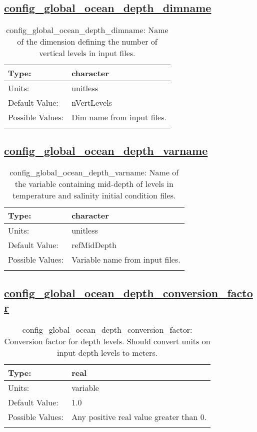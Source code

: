 \subsection[config\_global\_ocean\_depth\_dimname]{\hyperref[sec:nm_tab_global_ocean]{config\_global\_ocean\_depth\_dimname}}
\label{subsec:nm_sec_config_global_ocean_depth_dimname}
\begin{center}
\begin{longtable}{| p{2.0in} || p{4.0in} |}
    \hline
    Type: & character \\
    \hline
    Units: & \si{unitless} \\
    \hline
    Default Value: & nVertLevels \\
    \hline
    Possible Values: & Dim name from input files. \\
    \hline
    \caption{config\_global\_ocean\_depth\_dimname: Name of the dimension defining the number of vertical levels in input files.}
\end{longtable}
\end{center}
\subsection[config\_global\_ocean\_depth\_varname]{\hyperref[sec:nm_tab_global_ocean]{config\_global\_ocean\_depth\_varname}}
\label{subsec:nm_sec_config_global_ocean_depth_varname}
\begin{center}
\begin{longtable}{| p{2.0in} || p{4.0in} |}
    \hline
    Type: & character \\
    \hline
    Units: & \si{unitless} \\
    \hline
    Default Value: & refMidDepth \\
    \hline
    Possible Values: & Variable name from input files. \\
    \hline
    \caption{config\_global\_ocean\_depth\_varname: Name of the variable containing mid-depth of levels in temperature and salinity initial condition files.}
\end{longtable}
\end{center}
\subsection[config\_global\_ocean\_depth\_conversion\_factor]{\hyperref[sec:nm_tab_global_ocean]{config\_global\_ocean\_depth\_conversion\_factor}}
\label{subsec:nm_sec_config_global_ocean_depth_conversion_factor}
\begin{center}
\begin{longtable}{| p{2.0in} || p{4.0in} |}
    \hline
    Type: & real \\
    \hline
    Units: & \si{variable} \\
    \hline
    Default Value: & 1.0 \\
    \hline
    Possible Values: & Any positive real value greater than 0. \\
    \hline
    \caption{config\_global\_ocean\_depth\_conversion\_factor: Conversion factor for depth levels. Should convert units on input depth levels to meters.}
\end{longtable}
\end{center}

